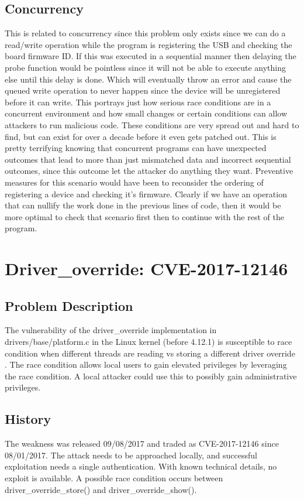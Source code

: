 \documentclass[12pt]{article}
\begin{document}
\subsection{Concurrency}
This is related to concurrency since this problem only exists since we can do a read/write operation while the program is registering the USB and checking the board firmware ID. If this was executed in a sequential manner then delaying the probe function would be pointless since it will not be able to execute anything else until this delay is done. Which will eventually throw an error and cause the queued write operation to never happen since the device will be unregistered before it can write. This portrays just how serious race conditions are in a concurrent environment and how small changes or certain conditions can allow attackers to run malicious code. These conditions are very spread out and hard to find, but can exist for over a decade before it even gets patched out. This is pretty terrifying knowing that concurrent programs can have unexpected outcomes that lead to more than just mismatched data and incorrect sequential outcomes, since this outcome let the attacker do anything they want. Preventive measures for this scenario would have been to reconsider the ordering of registering a device and checking it's firmware. Clearly if we have an operation that can nullify the work done in the previous lines of code, then it would be more optimal to check that scenario first then to continue with the rest of the program.


\section{Driver\_override: CVE-2017-12146}
\subsection{Problem Description}
The vulnerability of the driver\_override implementation in drivers/base/platform.c in the Linux kernel (before 4.12.1) is susceptible to race condition when different threads are reading vs storing a different driver override \cite{bugzilla}. The race condition allows local users to gain elevated privileges by leveraging the race condition. A local attacker could use this to possibly gain administrative privileges\cite{ubuntu-security}.

\subsection{History}
The weakness was released 09/08/2017 and traded as CVE-2017-12146 since 08/01/2017. The attack needs to be approached locally, and successful exploitation needs a single authentication. With known technical details, no exploit is available\cite{vuldb}. A possible race condition occurs between driver\_override\_store() and driver\_override\_show().
\end{document}
